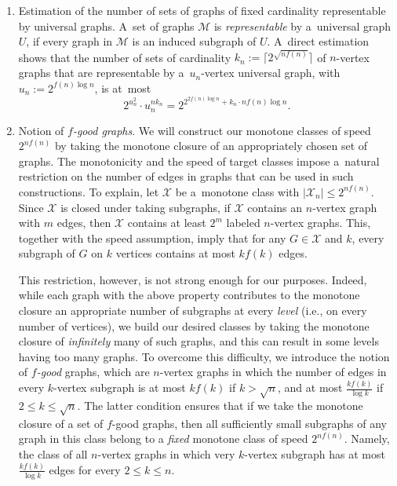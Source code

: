 \documentclass[letterpaper,11pt]{article}
\newcommand{\Mc}{\mathcal{M}}
\newcommand{\Xc}{\mathcal{X}}
\theoremstyle{definition}
\theoremstyle{remark}
\renewcommand{\leq}{\leqslant}
\begin{document}
	\begin{enumerate}
		\item Estimation of the number of sets of graphs of fixed cardinality representable by universal graphs. A~set of graphs $\Mc$ is \emph{representable} by a~universal graph $U$, if every graph in $\Mc$ is an induced subgraph of $U$.
		A~direct estimation shows that the number of sets of cardinality $k_n := \lceil 2^{\sqrt{nf(n)}} \rceil $ of $n$-vertex graphs that are representable by a~$u_n$-vertex universal graph, with $u_n := 2^{ f(n)\log n}$, is at~most 
		\begin{equation}\label{eq:num-representable}
			2^{u_n^2} \cdot u_n^{nk_n} = 2^{2^{2 f(n) \log n} + k_n \cdot n f(n)\log n}.
		\end{equation}
		
		\item Notion of \emph{$f$-good graphs}. 
		We will construct our monotone classes of speed $2^{nf(n)}$ by taking the monotone closure of an appropriately chosen set of graphs.
		The monotonicity and the speed of target classes impose a~natural restriction on the number of edges in graphs that can be used in such constructions.
		To explain, let $\Xc$ be a~monotone class with $|\Xc_n| \leq 2^{nf(n)}$.
		Since $\Xc$ is closed under taking subgraphs,
		if $\Xc$ contains an $n$-vertex graph with $m$ edges, then $\Xc$ contains at least $2^m$ labeled $n$-vertex graphs. This, together with the speed assumption, imply that for any $G \in \Xc$ and $k$, every subgraph of $G$ on $k$ vertices contains at most $kf(k)$ edges.
		
		This restriction, however, is not strong enough for our purposes.
		Indeed, while each graph with the above property contributes to the monotone closure an appropriate number of subgraphs at every \emph{level} (i.e., on every number of vertices), we build our desired classes by taking the monotone closure of \emph{infinitely} many of such graphs, and this can result in some levels having too many graphs.
		To overcome this difficulty, we introduce the notion of \emph{$f$-good} graphs, which are  $n$-vertex graphs in which the number of edges in every $k$-vertex subgraph is at most $kf(k)$
		if $k > \sqrt{n}$, and at most $\frac{kf(k)}{\log k}$ if $2 \leq k \leq \sqrt{n}$. The latter condition ensures that if we take the monotone closure of a set of $f$-good graphs, then all sufficiently small subgraphs of any graph in this class belong to a \emph{fixed} monotone class of speed $2^{nf(n)}$. Namely, the class of all $n$-vertex graphs in which very $k$-vertex subgraph has at most $\frac{kf(k)}{\log k}$ edges for every $2 \leq k \leq n$.
		

\end{enumerate}
\end{document}
